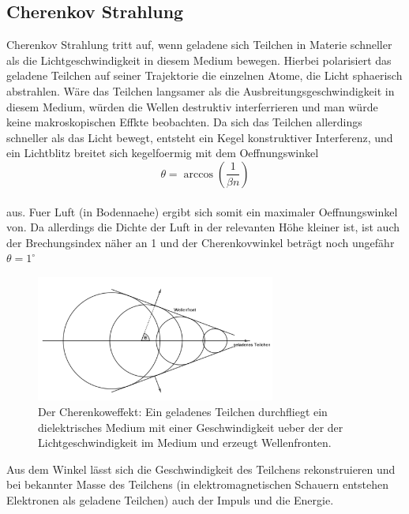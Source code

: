 \subsection{Cherenkov Strahlung}
Cherenkov Strahlung tritt auf, wenn geladene sich Teilchen in Materie schneller als die Lichtgeschwindigkeit in diesem Medium bewegen. Hierbei polarisiert das geladene Teilchen auf seiner Trajektorie die einzelnen Atome, die Licht sphaerisch abstrahlen. Wäre das Teilchen langsamer als die Ausbreitungsgeschwindigkeit in diesem Medium, würden die Wellen destruktiv interferrieren und man würde keine makroskopischen Effkte beobachten. Da sich das Teilchen allerdings schneller als das Licht bewegt, entsteht ein Kegel konstruktiver Interferenz, und ein Lichtblitz breitet sich kegelfoermig mit dem Oeffnungswinkel %
\begin{equation}
\theta = \arccos\left(\frac{1}{\beta n}\right) \label{eq:cherenkow}
\end{equation}\\
aus. Fuer Luft (in Bodennaehe) ergibt sich somit ein maximaler Oeffnungswinkel von. Da allerdings die Dichte der Luft in der relevanten Höhe kleiner ist, ist auch der Brechungsindex näher an 1 und der Cherenkovwinkel beträgt noch ungefähr $\theta = 1^{\circ}$\cite{Grupen}
\begin{figure}[htbp]
\centering
\includegraphics[width=0.7\textwidth]{Images/cherenkow.png}
\caption{Der Cherenkoweffekt: Ein geladenes Teilchen durchfliegt ein dielektrisches Medium mit einer Geschwindigkeit ueber der der Lichtgeschwindigkeit im Medium und erzeugt Wellenfronten.}
\label{img:cherenkow}
\end{figure}
Aus dem Winkel lässt sich die Geschwindigkeit des Teilchens rekonstruieren und bei bekannter Masse des Teilchens (in elektromagnetischen Schauern entstehen Elektronen als geladene Teilchen) auch der Impuls und die Energie.

